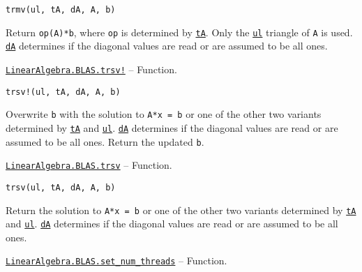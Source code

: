 \begin{adjustwidth}{2em}{0pt}


\begin{verbatim}
trmv(ul, tA, dA, A, b)
\end{verbatim}

Return \texttt{op(A)*b}, where \texttt{op} is determined by \hyperlink{15951037910221396131}{\texttt{tA}}. Only the \hyperlink{13880289478825450693}{\texttt{ul}} triangle of \texttt{A} is used. \hyperlink{285101993251198425}{\texttt{dA}} determines if the diagonal values are read or are assumed to be all ones.



\end{adjustwidth}
\hypertarget{10791367515297146957}{}
\hyperlink{10791367515297146957}{\texttt{LinearAlgebra.BLAS.trsv!}}  -- {Function.}

\begin{adjustwidth}{2em}{0pt}


\begin{verbatim}
trsv!(ul, tA, dA, A, b)
\end{verbatim}

Overwrite \texttt{b} with the solution to \texttt{A*x = b} or one of the other two variants determined by \hyperlink{15951037910221396131}{\texttt{tA}} and \hyperlink{13880289478825450693}{\texttt{ul}}. \hyperlink{285101993251198425}{\texttt{dA}} determines if the diagonal values are read or are assumed to be all ones. Return the updated \texttt{b}.



\end{adjustwidth}
\hypertarget{14529375247847983227}{}
\hyperlink{14529375247847983227}{\texttt{LinearAlgebra.BLAS.trsv}}  -- {Function.}

\begin{adjustwidth}{2em}{0pt}


\begin{verbatim}
trsv(ul, tA, dA, A, b)
\end{verbatim}

Return the solution to \texttt{A*x = b} or one of the other two variants determined by \hyperlink{15951037910221396131}{\texttt{tA}} and \hyperlink{13880289478825450693}{\texttt{ul}}. \hyperlink{285101993251198425}{\texttt{dA}} determines if the diagonal values are read or are assumed to be all ones.



\end{adjustwidth}
\hypertarget{2145233402822007277}{}
\hyperlink{2145233402822007277}{\texttt{LinearAlgebra.BLAS.set\_num\_threads}}  -- {Function.}


